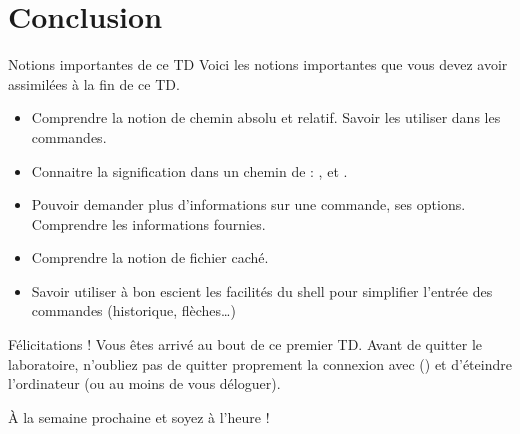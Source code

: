 \documentclass[a4paper,11pt]{style-esi/td}
\begin{document}
\section{Conclusion}

	\begin{theorie}{Notions importantes de ce TD}
		Voici les notions importantes que vous devez avoir assimilées à la fin de ce TD.
		\begin{itemize}
		\item 
			Comprendre la notion de chemin absolu et relatif.
			Savoir les utiliser dans les commandes.
		\item 
			Connaitre la signification dans un chemin de : 
			\og{}\samp{\textasciitilde}\fg{},
			\og{}\fg{} et \og{}\fg{}.
		\item 
			Pouvoir demander plus d'informations sur une commande, ses options.
			Comprendre les informations fournies.
		\item 
			Comprendre la notion de fichier caché.
		\item 
			Savoir utiliser à bon escient les facilités du shell
			pour simplifier l'entrée des commandes (historique, flèches\dots)
		\end{itemize}
	\end{theorie}

	\bigskip
	\begin{infotbox}{Félicitations !} 
		Vous êtes arrivé au bout de ce premier TD.
		Avant de quitter le laboratoire, n'oubliez pas de quitter proprement 
		la connexion avec  () 
		et d'éteindre l'ordinateur (ou au moins de vous déloguer).

		À la semaine prochaine et soyez à l'heure !
	\end{infotbox}
\end{document}
